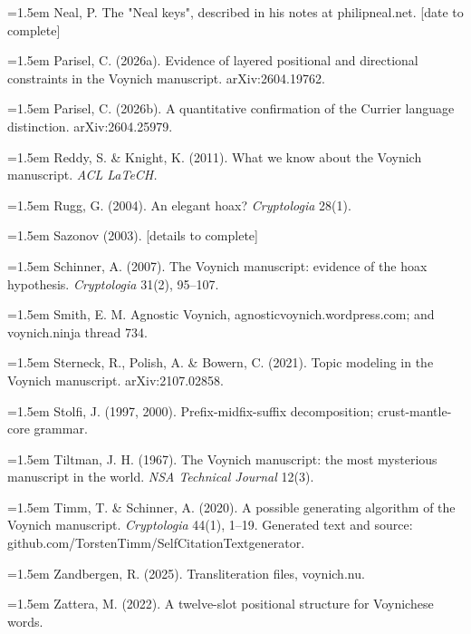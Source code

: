 \documentclass[11pt,a4paper]{article}
\begin{document}
\noindent\hangindent=1.5em Neal, P. The "Neal keys", described in his notes at philipneal.net. [date to complete]\par
\noindent\hangindent=1.5em Parisel, C. (2026a). Evidence of layered positional and directional constraints in the Voynich manuscript. arXiv:2604.19762.\par
\noindent\hangindent=1.5em Parisel, C. (2026b). A quantitative confirmation of the Currier language distinction. arXiv:2604.25979.\par
\noindent\hangindent=1.5em Reddy, S. \& Knight, K. (2011). What we know about the Voynich manuscript. \emph{ACL LaTeCH.}\par
\noindent\hangindent=1.5em Rugg, G. (2004). An elegant hoax? \emph{Cryptologia} 28(1).\par
\noindent\hangindent=1.5em Sazonov (2003). [details to complete]\par
\noindent\hangindent=1.5em Schinner, A. (2007). The Voynich manuscript: evidence of the hoax hypothesis. \emph{Cryptologia} 31(2), 95--107.\par
\noindent\hangindent=1.5em Smith, E. M. Agnostic Voynich, agnosticvoynich.wordpress.com; and voynich.ninja thread 734.\par
\noindent\hangindent=1.5em Sterneck, R., Polish, A. \& Bowern, C. (2021). Topic modeling in the Voynich manuscript. arXiv:2107.02858.\par
\noindent\hangindent=1.5em Stolfi, J. (1997, 2000). Prefix-midfix-suffix decomposition; crust-mantle-core grammar.\par
\noindent\hangindent=1.5em Tiltman, J. H. (1967). The Voynich manuscript: the most mysterious manuscript in the world. \emph{NSA Technical Journal} 12(3).\par
\noindent\hangindent=1.5em Timm, T. \& Schinner, A. (2020). A possible generating algorithm of the Voynich manuscript. \emph{Cryptologia} 44(1), 1--19. Generated text and source: github.com/TorstenTimm/SelfCitationTextgenerator.\par
\noindent\hangindent=1.5em Zandbergen, R. (2025). Transliteration files, voynich.nu.\par
\noindent\hangindent=1.5em Zattera, M. (2022). A twelve-slot positional structure for Voynichese words.\par
\end{document}

